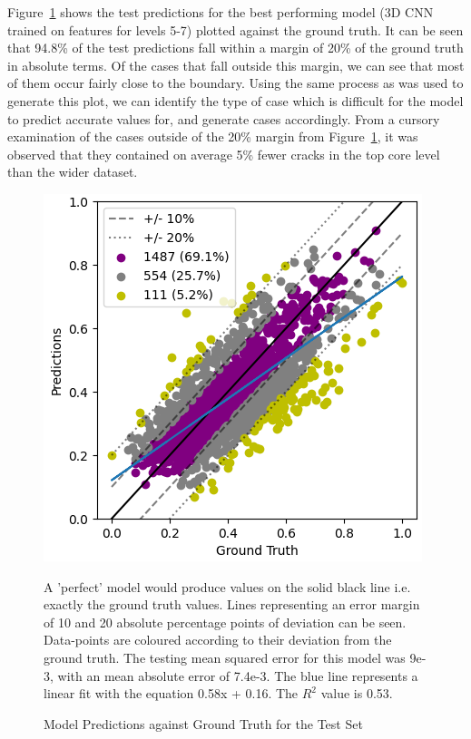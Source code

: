 \noindent
Figure~\ref{fig:best_margins} shows the test predictions for the best performing model (3D CNN trained on features for levels 5-7) plotted against the ground truth. It can be seen that 94.8\% of the test predictions fall within a margin of 20\%  of the ground truth in absolute terms. Of the cases that fall outside this margin, we can see that most of them occur fairly close to the boundary. Using the same process as was used to generate this plot, we can identify the type of case which is difficult for the model to predict accurate values for, and generate cases accordingly. From a cursory examination of the cases outside of the 20\% margin from Figure~\ref{fig:best_margins}, it was observed that they contained on average 5\% fewer cracks in the top core level than the wider dataset. 
\\



\begin{figure}[h]
	\centering
	\includegraphics[scale=0.65]{Figures/best_results_distribution_margins.png}
	\caption{Model Predictions against Ground Truth for the Test Set} {A 'perfect' model would produce values on the solid black line i.e. exactly the ground truth values. Lines representing an error margin of 10 and 20 absolute percentage points of deviation can be seen. Data-points are coloured according to their deviation from the ground truth. The testing mean squared error for this model was 9e-3, with an mean absolute error of 7.4e-3. The blue line represents a linear fit with the equation 0.58x + 0.16. The $R^2$ value is 0.53. }
	\label{fig:best_margins}
\end{figure}

